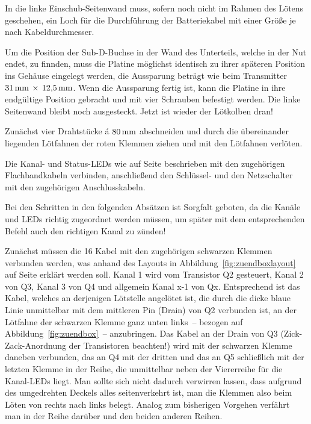 \documentclass[pdftex, parskip, numbers=noenddot, toc=listof]{scrbook}
\begin{document}
				In die linke Einschub-Seitenwand muss, sofern noch nicht im Rahmen des Lötens geschehen, ein Loch für die Durchführung der Batteriekabel mit einer Größe je nach Kabeldurchmesser.

				Um die Position der Sub-D-Buchse in der Wand des Unterteils, welche in der Nut endet, zu finnden, muss die Platine möglichst identisch zu ihrer späteren Position ins Gehäuse eingelegt werden, die Aussparung beträgt wie beim Transmitter $\unit[31]{mm}\,\times\,\unit[12{,}5]{mm}$. Wenn die Aussparung fertig ist, kann die Platine in ihre endgültige Position gebracht und mit vier Schrauben befestigt werden. Die linke Seitenwand bleibt noch ausgesteckt. Jetzt ist wieder der Lötkolben dran!

				Zunächst vier Drahtstücke á $\unit[80]{mm}$ abschneiden und durch die übereinander liegenden Lötfahnen der roten Klemmen ziehen und mit den Lötfahnen verlöten.

				Die Kanal- und Status-LEDs wie auf Seite \pageref{enum:leds} beschrieben mit den zugehörigen Flachbandkabeln verbinden, anschließend den Schlüssel- und den Netzschalter mit den zugehörigen Anschlusskabeln.

				Bei den Schritten in den folgenden Absätzen ist Sorgfalt geboten, da die Kanäle und LEDs richtig zugeordnet werden müssen, um später mit dem entsprechenden Befehl auch den richtigen Kanal zu zünden!

				Zunächst müssen die 16 Kabel mit den zugehörigen schwarzen Klemmen verbunden werden, was anhand des Layouts in Abbildung~\ref{fig:zuendboxlayout} auf Seite \pageref{fig:zuendboxlayout} erklärt werden soll. Kanal 1 wird vom Transistor Q2 gesteuert, Kanal 2 von Q3, Kanal 3 von Q4 und allgemein Kanal x-1 von Qx. Entsprechend ist das Kabel, welches an derjenigen Lötstelle angelötet ist, die durch die dicke blaue Linie unmittelbar mit dem mittleren Pin (Drain) von Q2 verbunden ist, an der Lötfahne der schwarzen Klemme ganz unten links~-- bezogen auf Abbildung~\ref{fig:zuendbox}~-- anzubringen. Das Kabel an der Drain von Q3 (Zick-Zack-Anordnung der Transistoren beachten!) wird mit der schwarzen Klemme daneben verbunden, das an Q4 mit der dritten und das an Q5 schließlich mit der letzten Klemme in der Reihe, die unmittelbar neben der Viererreihe für die Kanal-LEDs liegt. Man sollte sich nicht dadurch verwirren lassen, dass aufgrund des umgedrehten Deckels alles seitenverkehrt ist, man die Klemmen also beim Löten von rechts nach links belegt. Analog zum bisherigen Vorgehen verfährt man in der Reihe darüber und den beiden anderen Reihen.
\end{document}
